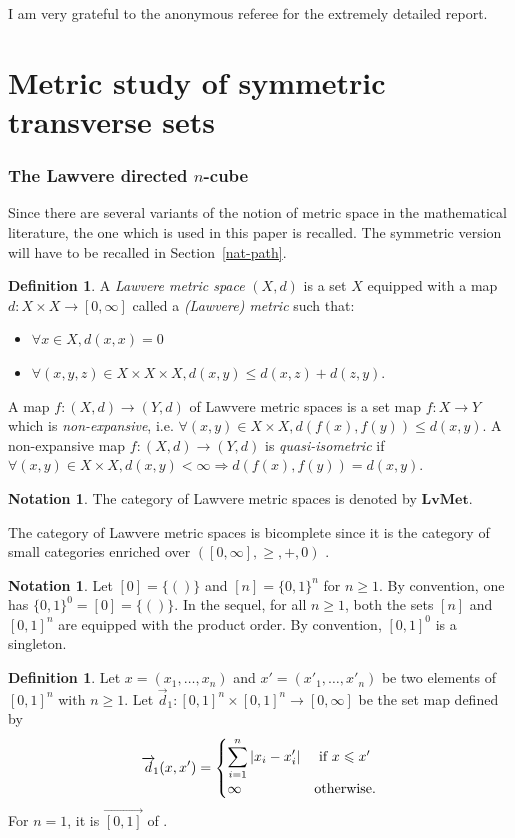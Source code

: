 \documentclass[a4paper,12pt]{amsart}
\newcommand{\p}{\times}
\renewcommand{\vec}{\overrightarrow}
\theoremstyle{definition}
\newtheorem{defn}[thm]{Definition}
\newcommand{\bd}{\begin{defn}}
\newcommand{\ed}{\end{defn}}
\newtheorem{nota}[thm]{Notation}
\renewcommand{\leq}{\leqslant}
\renewcommand{\geq}{\geqslant}
\newcommand{\mins}[1]{\texorpdfstring{$#1$}{Lg}}
\newcommand{\vd}{\vec{d}\!_1}
\newcommand{\LMet}{\mathbf{LvMet}}
\begin{document}
I am very grateful to the anonymous referee for the extremely detailed report.



\part{Metric study of symmetric transverse sets}
\label{metric}


\section{The Lawvere directed \mins{n}-cube}
\label{lawveremetric}

Since there are several variants of the notion of metric space in the mathematical literature, the one which is used in this paper is recalled. The symmetric version will have to be recalled in Section~\ref{nat-path}.

\bd \cite{LawvereMetric}
A \textit{Lawvere metric space} $(X,d)$ is a set $X$ equipped with a map $d:X\p X\to [0,\infty]$ called a \textit{(Lawvere) metric} such that:
\begin{itemize}
	\item $\forall x\in X,d(x,x)=0$
	\item $\forall (x,y,z)\in X\p X\p X, d(x,y)\leq d(x,z)+d(z,y)$.
\end{itemize}
A map $f:(X,d)\to (Y,d)$ of Lawvere metric spaces is a set map $f:X\to Y$ which is \textit{non-expansive}, i.e. $\forall (x,y)\in X\p X, d(f(x),f(y))\leq d(x,y)$. A non-expansive map $f:(X,d)\to (Y,d)$ is \textit{quasi-isometric} if $\forall (x,y)\in X\p X, d(x,y)<\infty \Rightarrow d(f(x),f(y))= d(x,y)$.
\ed

\begin{nota}
	The category of Lawvere metric spaces is denoted by $\LMet$.
\end{nota}

The category of Lawvere metric spaces is bicomplete since it is the category of small categories enriched over $([0,\infty],\geq,+,0)$ \cite{LawvereMetric}.

\begin{nota}
	Let $[0] = \{()\}$ and $[n] = \{0,1\}^n$ for $n \geq 1$. By convention, one has $\{0,1\}^0=[0]=\{()\}$. In the sequel, for all $n\geq 1$, both the sets $[n]$ and $[0,1]^n$ are equipped with the product order. By convention, $[0,1]^0$ is a singleton.
\end{nota}


\bd \label{d1}
	Let $x=(x_1,\dots,x_n)$ and $x'=(x'_1,\dots,x'_n)$ be two elements of $[0,1]^n$ with $n\geq 1$. Let $\vd:[0,1]^n\p [0,1]^n \to [0,\infty]$ be the set map defined by
	\[
	\vd(x,x') = 
	\begin{cases}
		\displaystyle\sum\limits_{i=1}^{n} |x_i-x'_i| & \hbox{ if } x\leq x'\\
		\infty & \hbox {otherwise.}
	\end{cases}
	\]
	For $n=1$, it is $\vec{[0,1]}$ of \cite[Example~3.2]{zbMATH07226006}.
\ed
\end{document}
